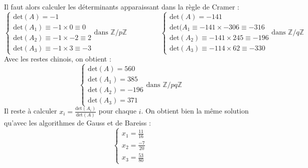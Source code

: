 \documentclass[french]{article}
\begin{document}
Il faut alors calculer les déterminants apparaissant dans la règle de Cramer :
\begin{equation*}
	\begin{cases}
		\mbox{det}(A) = -1\\
		\mbox{det}(A_1) \equiv -1 \times 0 \equiv 0\\
		\mbox{det}(A_2) \equiv -1 \times -2 \equiv 2\\
		\mbox{det}(A_3) \equiv -1 \times 3 \equiv -3
	\end{cases}
	\mbox{dans } \mathbb{Z}/p\mathbb{Z}
	\hspace{2cm}
	\begin{cases}
		\mbox{det}(A) = -141\\
		\mbox{det}(A_1\equiv -141 \times -306 \equiv -316\\
		\mbox{det}(A_2) \equiv -141 \times 245 \equiv -196\\
		\mbox{det}(A_3) \equiv -114 \times 62 \equiv -330
	\end{cases}
	\mbox{dans } \mathbb{Z}/q\mathbb{Z}
\end{equation*}
Avec les restes chinois, on obtient :
\begin{equation*}
	\begin{cases}
		\mbox{det}(A) = 560\\
		\mbox{det}(A_1) = 385\\
		\mbox{det}(A_2) = -196\\
		\mbox{det}(A_3) = 371
	\end{cases}
	\mbox{dans } \mathbb{Z}/pq\mathbb{Z}
\end{equation*}
Il reste à calculer $x_i = \frac{\mbox{det}(A_i)}{\mbox{det}(A)}$ pour chaque $i$. On obtient bien la même solution qu'avec les algorithmes de Gauss et de Bareiss :
\begin{equation*}
	\begin{cases}
		x_1 = \frac{11}{16}\\
		x_2 = \frac{-7}{20}\\
		x_3 = \frac{53}{80}
	\end{cases}
\end{equation*}
\end{document}
